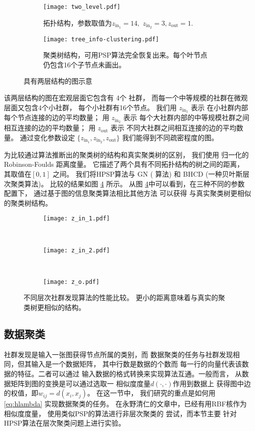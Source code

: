 \begin{figure}
	\centering
	\begin{subfigure}{0.45\textwidth}
		\texttt{[image: two\_level.pdf]}
		\caption{拓扑结构，参数取值为$z_{\mathrm{in}_1} = 14,$ $z_{\mathrm{in}_2} = 3, z_{\mathrm{out}}=1$.}\label{fig:c1}
	\end{subfigure}
	\begin{subfigure}{0.45\textwidth}
		\texttt{[image: tree\_info-clustering.pdf]}
		\caption{聚类树结构，可用PSP算法完全恢复出来。每个叶节点仍包含16个子节点未画出。}
    \label{fig:c2}
	\end{subfigure}
	\caption{具有两层结构的图示意}
\end{figure}

该两层结构的图在宏观层面它包含有 4个 社群，
而每一个中等规模的社群在微观层面又包含4个小社群，
每个小社群有16个节点。
我们用 $z_{\mathrm{in}_1}$ 表示
在小社群内部每个节点连接的边的平均数量；
用 $z_{\mathrm{in}_2}$ 表示
每个大社群内部的中等规模社群之间相互连接的边的平均数量；
用 $z_{\mathrm{out}}$ 表示
不同大社群之间相互连接的边的平均数量。
通过变化参数设定 $\{z_{\mathrm{in}_1}, z_{\mathrm{in}_2}, z_{\mathrm{out}} \}$
我们能得到不同疏密程度的图。

为比较通过算法推断出的聚类树的结构和真实聚类树的区别，
我们使用 归一化的 Robinson-Foulds 距离度量。
它描述了两个具有不同拓扑结构的树之间的距离，
其取值在$[0,1]$ 之间。
我们将HPSP算法与
GN (   算法) 和 BHCD (一种贝叶斯层次聚类算法\cite{RN23})。
比较的结果如图 \ref{fig:cdr} 所示。
从图 \ref{fig:cdr}中可以看到，在三种不同的参数配置下，
通过基于图的信息聚类算法相比其他方法 可以获得
与真实聚类树更相似的聚类树结构。

\begin{figure}
	\centering
	\begin{subfigure}{0.33\textwidth}
		\texttt{[image: z\_in\_1.pdf]}
		\caption{}
	\end{subfigure}~
	\begin{subfigure}{0.33\textwidth}
		\texttt{[image: z\_in\_2.pdf]}
		\caption{}
	\end{subfigure}~
	\begin{subfigure}{0.33\textwidth}
		\texttt{[image: z\_o.pdf]}
		\caption{}
	\end{subfigure}
	\caption{不同层次社群发现算法的性能比较。
  更小的距离意味着与真实的聚类树更相似的结构。
  }\label{fig:cdr}	
\end{figure}

\subsection{数据聚类}
\label{sec:data_clustering}
社群发现是输入一张图获得节点所属的类别，而
数据聚类的任务与社群发现相同，但其输入是一个数据矩阵，
其中行数是数据的个数而
每一行的向量代表该数据的特征。二者可以通过
输入数据的格式转换来实现算法互通。一般而言，
从数据矩阵到图的变换是可以通过选取一
相似度度量$d(\cdot,\cdot)$作用到数据上
获得图中边的权值，即$w_{ij}=d(x_i, x_j)$。
在这一节中，
我们研究的重点是如何用
\eqref{eq:hlambda} 实现数据聚类的任务。
在永野清仁的文章中\cite{mac}，已经有用RBF核作为相似度度量，
使用类似PSP的算法进行非层次聚类的
尝试，而本节主要
针对HPSP算法在层次聚类问题上进行实验。

